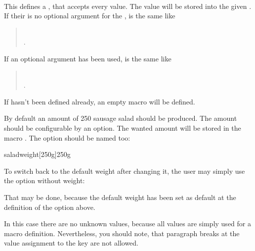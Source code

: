 \begin{Declaration}
                         \\
\end{Declaration}
%
This defines a , that accepts
every value. The value will be stored into the given . If their
is no optional argument for the ,  is
the same like
\begin{quote}
%
\\
%
.
\end{quote}
If an optional argument  has been used, 
is the same like
\begin{quote}
%
\\
%
%
.
\end{quote}
If  hasn't been defined already, an empty macro will be
defined.
\begin{Example}
  By default an amount of 250 sausage salad should be produced. The
  amount should be configurable by an option. The wanted amount will be stored
  in the macro . The option should be named
   too:
\begin{lstcode}
  \newcommand*{\saladweight}{250g}
                  {saladweight}[250g]{\saladweight}
\end{lstcode}
  To switch back to the default weight after changing it, the user may simply
  use the option without weight:
\begin{lstcode}
\end{lstcode}
  That may be done, because the default weight has been set as default at the
  definition of the option above.
\end{Example}
In this case there are no unknown values, because all values are simply used
for a macro definition. Nevertheless, you should note, that paragraph breaks
at the value assignment to the key are not allowed.
%
%


